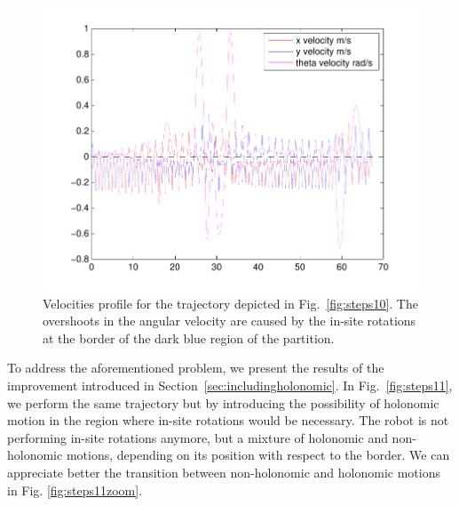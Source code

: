 \begin{figure}[ht]
\centering
\includegraphics[scale=0.7  ]{Chap5-Visual-Planning/velocities10.pdf}
\caption{Velocities profile for the trajectory depicted in Fig.~\ref{fig:steps10}. The overshoots in the angular velocity are caused by the in-site rotations at the border of the dark blue region of the partition.}
\label{fig:velocities10}
\end{figure}

To address the aforementioned problem, we present the results of the improvement introduced in Section~\ref{sec:includingholonomic}. In Fig.~\ref{fig:steps11}, we perform the same trajectory but by introducing the possibility of holonomic motion in the region where in-site rotations would be necessary. The robot is not performing in-site rotations anymore, but a mixture of holonomic and non-holonomic motions, depending on its position with respect to the border. We can appreciate better the transition between non-holonomic and holonomic motions in Fig. \ref{fig:steps11zoom}. %

